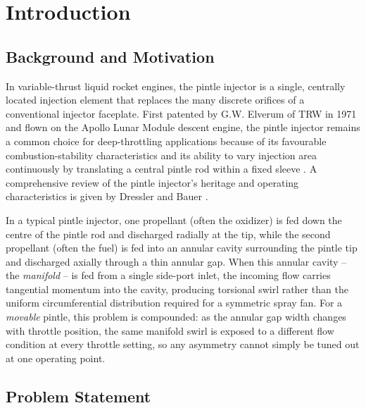 \documentclass[11pt,a4paper]{article}
\begin{document}
\clearpage

\tableofcontents
\listoffigures
\listoftables

\clearpage
{}

\section{Introduction}

\subsection{Background and Motivation}

In variable-thrust liquid rocket engines, the pintle injector is a single, centrally located injection element that replaces the many discrete orifices of a conventional injector faceplate. First patented by G.W. Elverum of TRW in 1971 \cite{elverum1971} and flown on the Apollo Lunar Module descent engine, the pintle injector remains a common choice for deep-throttling applications because of its favourable combustion-stability characteristics and its ability to vary injection area continuously by translating a central pintle rod within a fixed sleeve \cite{dressler2000,nardi_rezende}. A comprehensive review of the pintle injector's heritage and operating characteristics is given by Dressler and Bauer \cite{dressler2000}.

In a typical pintle injector, one propellant (often the oxidizer) is fed down the centre of the pintle rod and discharged radially at the tip, while the second propellant (often the fuel) is fed into an annular cavity surrounding the pintle tip and discharged axially through a thin annular gap. When this annular cavity -- the \emph{manifold} -- is fed from a single side-port inlet, the incoming flow carries tangential momentum into the cavity, producing torsional swirl rather than the uniform circumferential distribution required for a symmetric spray fan. For a \emph{movable} pintle, this problem is compounded: as the annular gap width changes with throttle position, the same manifold swirl is exposed to a different flow condition at every throttle setting, so any asymmetry cannot simply be tuned out at one operating point.

\subsection{Problem Statement}
\end{document}
